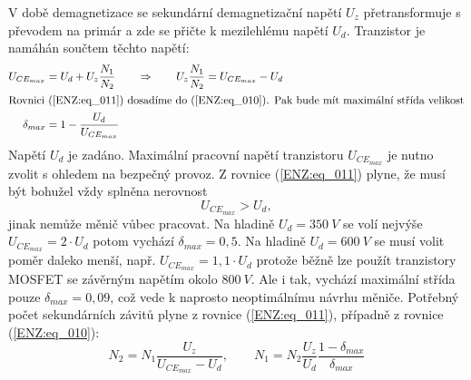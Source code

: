   V době demagnetizace se sekundární demagnetizační napětí \(U_z\) přetransformuje s převodem na 
  primár a zde se přičte k mezilehlému napětí \(U_d\). Tranzistor je namáhán součtem těchto 
  napětí:
  \begin{align}
    U_{CE_{max}} &= U_d + U_z\frac{N_1}{N_2}   \qquad \Rightarrow \qquad 
    U_z\frac{N_1}{N_2} = U_{CE_{max}} - U_d    \label{ENZ:eq_011} \\
    \shortintertext{Rovnici (\ref{ENZ:eq_011}) dosadíme do (\ref{ENZ:eq_010}). Pak bude mít 
                    maximální střída velikost}
    \delta_{max} &= 1-\frac{U_d}{U_{CE_{max}}} \label{ENZ:eq_030}
  \end{align}
  Napětí \(U_d\) je zadáno. Maximální pracovní napětí tranzistoru \(U_{CE_{max}}\) je nutno 
  zvolit s ohledem na bezpečný provoz. Z rovnice (\ref{ENZ:eq_011}) plyne, že musí být bohužel 
  vždy splněna nerovnost
  \begin{equation}\label{ENZ:eq_012}
   U_{CE_{max}} > U_d,
  \end{equation}
  jinak nemůže měnič vůbec pracovat. Na hladině \(U_d = \qty{350}{V}\) se volí nejvýše 
  \(U_{CE_{max}} =  2\cdot U_d\) potom vychází \(\delta_{max} = 0,5\). Na hladině \(U_d = 
  \qty{600}{V}\) se musí volit poměr daleko menší, např. \(U_{CE_{max}} =  1,1\cdot U_d\) protože 
  běžně lze použít tranzistory MOSFET se závěrným napětím okolo \(\qty{800}{V}\). Ale i tak, 
  vychází maximální střída pouze \(\delta_{max} = 0,09\), což vede k naprosto neoptimálnímu 
  návrhu měniče. Potřebný počet sekundárních závitů plyne z rovnice (\ref{ENZ:eq_011}), případně 
  z rovnice (\ref{ENZ:eq_010}):
  \begin{equation}\label{ENZ:eq_013}
    N_2 = N_1\frac{U_z}{U_{CE_{max}}-U_d}, \qquad 
    N_1 = N_2\frac{U_z}{U_d}\frac{1-\delta_{max}}{\delta_{max}}
  \end{equation}
  
